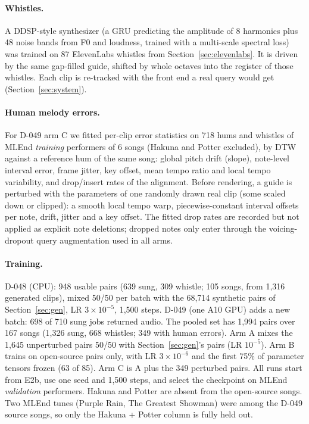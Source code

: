 \documentclass[11pt]{article}
\begin{document}
\paragraph{Whistles.} A DDSP-style synthesizer \citep{engel2020ddsp} (a GRU predicting the amplitude of 8 harmonics plus 48 noise bands from F0 and loudness, trained with a multi-scale spectral loss) was trained on 87 ElevenLabs whistles from Section~\ref{sec:elevenlabs}. It is driven by the same gap-filled guide, shifted by whole octaves into the register of those whistles. Each clip is re-tracked with the front end a real query would get (Section~\ref{sec:system}).

\paragraph{Human melody errors.} For D-049 arm C we fitted per-clip error statistics on 718 hums and whistles of MLEnd \emph{training} performers of 6 songs (Hakuna and Potter excluded), by DTW against a reference hum of the same song: global pitch drift (slope), note-level interval error, frame jitter, key offset, mean tempo ratio and local tempo variability, and drop/insert rates of the alignment. Before rendering, a guide is perturbed with the parameters of one randomly drawn real clip (some scaled down or clipped): a smooth local tempo warp, piecewise-constant interval offsets per note, drift, jitter and a key offset. The fitted drop rates are recorded but not applied as explicit note deletions; dropped notes only enter through the voicing-dropout query augmentation used in all arms.

\paragraph{Training.} D-048 (CPU): 948 usable pairs (639 sung, 309 whistle; 105 songs, from 1,316 generated clips), mixed 50/50 per batch with the 68,714 synthetic pairs of Section~\ref{sec:gen}, LR $3\times10^{-5}$, 1,500 steps. D-049 (one A10 GPU) adds a new batch: 698 of 710 sung jobs returned audio. The pooled set has 1,994 pairs over 167 songs (1,326 sung, 668 whistles; 349 with human errors). Arm A mixes the 1,645 unperturbed pairs 50/50 with Section~\ref{sec:gen}'s pairs (LR $10^{-5}$). Arm B trains on open-source pairs only, with LR $3\times10^{-6}$ and the first 75\% of parameter tensors frozen (63 of 85). Arm C is A plus the 349 perturbed pairs. All runs start from E2b, use one seed and 1,500 steps, and select the checkpoint on MLEnd \emph{validation} performers. Hakuna and Potter are absent from the open-source songs. Two MLEnd tunes (Purple Rain, The Greatest Showman) were among the D-049 source songs, so only the Hakuna + Potter column is fully held out.
\end{document}
